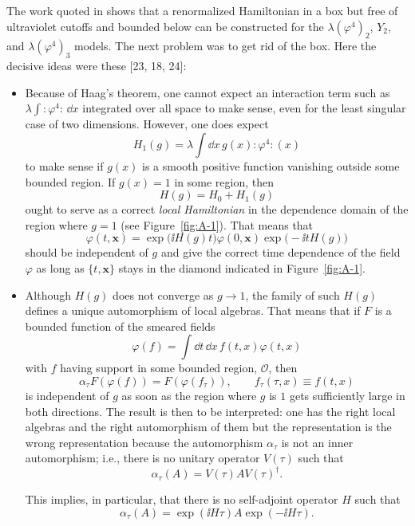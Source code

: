 The work quoted in \cite{pct-app-15,pct-app-16,pct-app-17,pct-app-18,pct-app-19,pct-app-20,pct-app-21,pct-app-22} shows that a renormalized Hamiltonian in a box but
free of ultraviolet cutoffs and bounded below can be constructed for the
$\lambda(\varphi^4)_2$, $Y_2$, and $\lambda(\varphi^4)_3$ models. The next
problem was to get rid of the box. Here the decisive ideas were these [23, 18,
24]:

\begin{itemize}
\item[(c)] Because of Haag's theorem, one cannot expect an interaction term
  such as $\lambda\int :\varphi^4:\,\dd x$ integrated over all space to make
  sense, even
for the least singular case of two dimensions. However, one does expect
\[
  H_1(g)=\lambda\int \dd x\,g(x):\varphi^4:(x)
\]
to make sense if $g(x)$ is a smooth positive function vanishing outside some
bounded region. If $g(x)=1$ in some region, then
\[
  H(g)=H_0+H_1(g)
\]
ought to serve as a correct \emph{local Hamiltonian} in the dependence domain
of the region where $g=1$ (see Figure~\ref{fig:A-1}). That means that
\[
  \varphi(t,\mathbf{x})
  =\exp\!\bigl(\ii H(g)t\bigr)\varphi(0,\mathbf{x})
    \exp\!\bigl(-\ii tH(g)\bigr)
\]
should be independent of $g$ and give the correct time dependence of the field
$\varphi$ as long as $\{t,\mathbf{x}\}$ stays in the diamond indicated in
Figure~\ref{fig:A-1}.



\item[(d)] Although $H(g)$ does not converge as $g\to1$, the family of such
  $H(g)$ defines a unique automorphism of local algebras. That means that if
  $F$ is a bounded function of the smeared fields
\[
  \varphi(f)=\int\dd t\,\dd x\,f(t,x)\varphi(t,x)
\]
with $f$ having support in some bounded region, $\mathcal{O}$, then
\[
  \alpha_\tau F(\varphi(f))=F(\varphi(f_\tau)),
  \qquad f_\tau(\tau,x)\equiv f(t,x)
\]
is independent of $g$ as soon as the region where $g$ is $1$ gets sufficiently
large in both directions. The result is then to be interpreted: one has
the right local algebras and the right automorphism of them but the
representation is the wrong representation because the automorphism
$\alpha_\tau$ is not an inner automorphism; i.e., there is no unitary operator
$V(\tau)$ such that
\[
  \alpha_\tau(A)=V(\tau)A V(\tau)^\dagger.
\]

This implies, in particular, that there is no self-adjoint operator $H$ such
that
\[
  \alpha_\tau(A)=\exp(\ii H\tau)A\exp(-\ii H\tau).
\]


\end{itemize}

